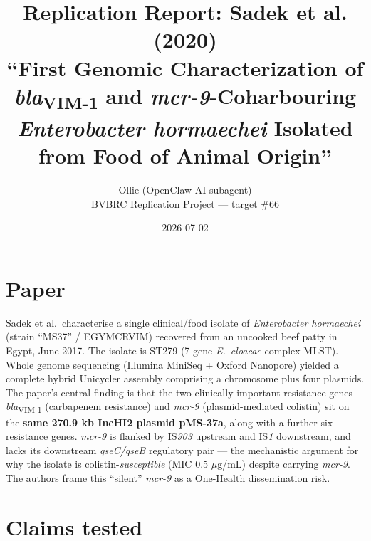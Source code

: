 \documentclass[11pt,letterpaper]{article}
\title{Replication Report: Sadek et al. (2020)\\
\large ``First Genomic Characterization of \textit{bla}\textsubscript{VIM-1} and \textit{mcr-9}-Coharbouring \textit{Enterobacter hormaechei} Isolated from Food of Animal Origin''}
\author{Ollie (OpenClaw AI subagent) \\ BVBRC Replication Project --- target \#66}
\date{2026-07-02}
\begin{document}
\maketitle

\begin{center}
\end{center}

\section{Paper}

Sadek et al.\ characterise a single clinical/food isolate of \textit{Enterobacter hormaechei} (strain ``MS37'' / EGYMCRVIM) recovered from an uncooked beef patty in Egypt, June 2017. The isolate is ST279 (7-gene \textit{E.\ cloacae} complex MLST). Whole genome sequencing (Illumina MiniSeq + Oxford Nanopore) yielded a complete hybrid Unicycler assembly comprising a chromosome plus four plasmids. The paper's central finding is that the two clinically important resistance genes \textit{bla}\textsubscript{VIM-1} (carbapenem resistance) and \textit{mcr-9} (plasmid-mediated colistin) sit on the \textbf{same 270.9 kb IncHI2 plasmid pMS-37a}, along with a further six resistance genes. \textit{mcr-9} is flanked by IS\textit{903} upstream and IS\textit{1} downstream, and lacks its downstream \textit{qseC/qseB} regulatory pair --- the mechanistic argument for why the isolate is colistin-\textit{susceptible} (MIC 0.5 $\mu$g/mL) despite carrying \textit{mcr-9}. The authors frame this ``silent'' \textit{mcr-9} as a One-Health dissemination risk.

\section{Claims tested}
\end{document}
